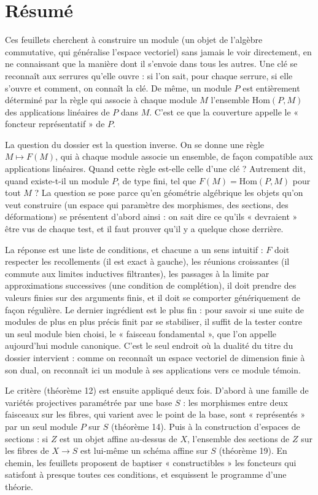 \documentclass[11pt,a4paper]{article}
\begin{document}
\section*{Résumé}

\begin{resume}
Ces feuillets cherchent à construire un module (un objet de l'algèbre
commutative, qui généralise l'espace vectoriel) sans jamais le voir
directement, en ne connaissant que la manière dont il s'envoie dans tous les
autres. Une clé se reconnaît aux serrures qu'elle ouvre : si l'on sait, pour
chaque serrure, si elle s'ouvre et comment, on connaît la clé. De même, un
module $P$ est entièrement déterminé par la règle qui associe à chaque module
$M$ l'ensemble $\mathrm{Hom}(P, M)$ des applications linéaires de $P$ dans $M$.
C'est ce que la couverture appelle le « foncteur représentatif » de $P$.

La question du dossier est la question inverse. On se donne une règle
$M \mapsto F(M)$, qui à chaque module associe un ensemble, de façon compatible
aux applications linéaires. Quand cette règle est-elle celle d'une clé ?
Autrement dit, quand existe-t-il un module $P$, de type fini, tel que
$F(M) = \mathrm{Hom}(P, M)$ pour tout $M$ ? La question se pose parce qu'en
géométrie algébrique les objets qu'on veut construire (un espace qui
paramètre des morphismes, des sections, des déformations) se présentent
d'abord ainsi : on sait dire ce qu'ils « devraient » être vus de chaque test,
et il faut prouver qu'il y a quelque chose derrière.

La réponse est une liste de conditions, et chacune a un sens intuitif : $F$
doit respecter les recollements (il est exact à gauche), les réunions
croissantes (il commute aux limites inductives filtrantes), les passages à la
limite par approximations successives (une condition de complétion), il doit
prendre des valeurs finies sur des arguments finis, et il doit se comporter
génériquement de façon régulière. Le dernier ingrédient est le plus fin : pour
savoir si une suite de modules de plus en plus précis finit par se stabiliser,
il suffit de la tester contre un seul module bien choisi, le « faisceau
fondamental », que l'on appelle aujourd'hui module canonique. C'est le seul
endroit où la dualité du titre du dossier intervient : comme on reconnaît un
espace vectoriel de dimension finie à son dual, on reconnaît ici un module à
ses applications vers ce module témoin.

Le critère (théorème 12) est ensuite appliqué deux fois. D'abord à une famille
de variétés projectives paramétrée par une base $S$ : les morphismes entre
deux faisceaux sur les fibres, qui varient avec le point de la base, sont
« représentés » par un seul module $P$ sur $S$ (théorème 14). Puis à la
construction d'espaces de sections : si $Z$ est un objet affine au-dessus de
$X$, l'ensemble des sections de $Z$ sur les fibres de $X \to S$ est lui-même un
schéma affine sur $S$ (théorème 19). En chemin, les feuillets proposent de
baptiser « constructibles » les foncteurs qui satisfont à presque toutes ces
conditions, et esquissent le programme d'une théorie.


\end{resume}
\end{document}
